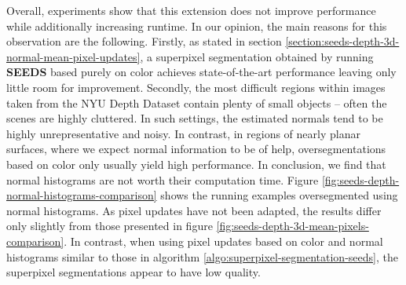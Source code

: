 Overall, experiments show that this extension does not improve performance while additionally increasing runtime. In our opinion, the main reasons for this observation are the following. Firstly, as stated in section \ref{section:seeds-depth-3d-normal-mean-pixel-updates}, a superpixel segmentation obtained by running \textbf{SEEDS} based purely on color achieves state-of-the-art performance leaving only little room for improvement. Secondly, the most difficult regions within images taken from the NYU Depth Dataset \cite{SilbermanHoiemKohliFergus:2012} contain plenty of small objects -- often the scenes are highly cluttered. In such settings, the estimated normals tend to be highly unrepresentative and noisy. In contrast, in regions of nearly planar surfaces, where we expect normal information to be of help, oversegmentations based on color only usually yield high performance. In conclusion, we find that normal histograms are not worth their computation time. Figure \ref{fig:seeds-depth-normal-histograms-comparison} shows the running examples oversegmented using normal histograms. As pixel updates have not been adapted, the results differ only slightly from those presented in figure \ref{fig:seeds-depth-3d-mean-pixels-comparison}. In contrast, when using pixel updates based on color and normal histograms similar to those in algorithm \ref{algo:superpixel-segmentation-seeds}, the superpixel segmentations appear to have low quality.
